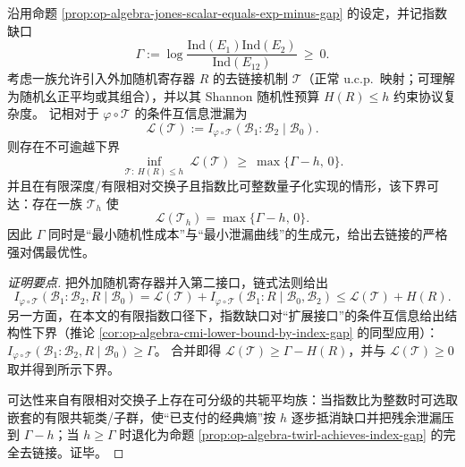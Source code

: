 \begin{theorem}\label{thm:op-algebra-optimal-delinking-curve}
沿用命题 \ref{prop:op-algebra-jones-scalar-equals-exp-minus-gap} 的设定，并记指数缺口
\[
\Gamma:=\log\frac{\mathrm{Ind}(E_1)\mathrm{Ind}(E_2)}{\mathrm{Ind}(E_{12})}\ \ge\ 0.
\]
考虑一族允许引入外加随机寄存器 \(R\) 的去链接机制 \(\mathcal{T}\)（正常 u.c.p.\ 映射；可理解为随机幺正平均或其组合），并以其 Shannon 随机性预算 \(H(R)\le h\) 约束协议复杂度。
记相对于 \(\varphi\circ\mathcal{T}\) 的条件互信息泄漏为
\[
\mathcal{L}(\mathcal{T})
:=
I_{\varphi\circ\mathcal{T}}(\mathcal{B}_1:\mathcal{B}_2\mid\mathcal{B}_0).
\]
则存在不可逾越下界
\[
\boxed{\;
\inf_{\mathcal{T}:\ H(R)\le h}\ \mathcal{L}(\mathcal{T})
\ \ge\ \max\{\Gamma-h,\,0\}.\;}
\]
并且在有限深度/有限相对交换子且指数比可整数量子化实现的情形，该下界可达：存在一族 \(\mathcal{T}_h\) 使
\[
\boxed{\;\mathcal{L}(\mathcal{T}_h)=\max\{\Gamma-h,\,0\}.\;}
\]
因此 \(\Gamma\) 同时是“最小随机性成本”与“最小泄漏曲线”的生成元，给出去链接的严格强对偶最优性。
\end{theorem}
\begin{proof}[证明要点]
把外加随机寄存器并入第二接口，链式法则给出
\[
I_{\varphi\circ\mathcal{T}}(\mathcal{B}_1:\mathcal{B}_2,R\mid\mathcal{B}_0)
=\mathcal{L}(\mathcal{T})+I_{\varphi\circ\mathcal{T}}(\mathcal{B}_1:R\mid\mathcal{B}_0,\mathcal{B}_2)
\le \mathcal{L}(\mathcal{T})+H(R).
\]
另一方面，在本文的有限指数口径下，指数缺口对“扩展接口”的条件互信息给出结构性下界（推论 \ref{cor:op-algebra-cmi-lower-bound-by-index-gap} 的同型应用）：
\(
I_{\varphi\circ\mathcal{T}}(\mathcal{B}_1:\mathcal{B}_2,R\mid\mathcal{B}_0)\ge\Gamma
\)。
合并即得 \(\mathcal{L}(\mathcal{T})\ge \Gamma-H(R)\)，并与 \(\mathcal{L}(\mathcal{T})\ge 0\) 取并得到所示下界。
\par
可达性来自有限相对交换子上存在可分级的共轭平均族：当指数比为整数时可选取嵌套的有限共轭类/子群，使“已支付的经典熵”按 \(h\) 逐步抵消缺口并把残余泄漏压到 \(\Gamma-h\)；当 \(h\ge\Gamma\) 时退化为命题 \ref{prop:op-algebra-twirl-achieves-index-gap} 的完全去链接。证毕。
\end{proof}

